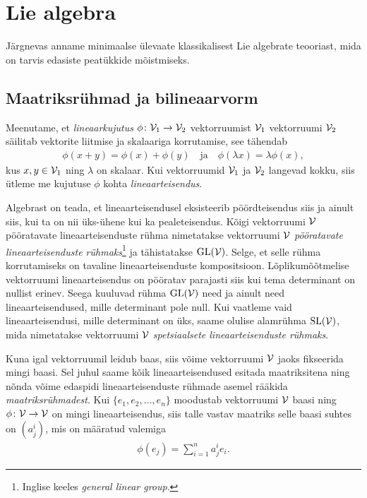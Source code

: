 

\section{Lie algebra}

Järgnevas anname minimaalse ülevaate klassikalisest Lie algebrate
teooriast, mida on tarvis edasiste peatükkide mõistmiseks.

\subsection{Maatriksrühmad ja bilineaarvorm}\label{subsec:mat-ryhmad}

Meenutame, et \emph{lineaarkujutus}
$\phi \colon \mathcal{V}_1 \to \mathcal{V}_2$ vektorruumist $\mathcal{V}_1$ vektorruumi $\mathcal{V}_2$ säilitab
vektorite liitmise ja skalaariga korrutamise, see tähendab
\begin{align*}
    \phi(x + y) = \phi(x) + \phi(y)
    \quad \text{ja} \quad
    \phi(\lambda x) = \lambda \phi(x),
\end{align*}
kus $x, y \in \mathcal{V}_1$ ning $\lambda$ on skalaar. Kui vektorruumid $\mathcal{V}_1$ ja
$\mathcal{V}_2$ langevad kokku, siis ütleme me kujutuse $\phi$ kohta
\emph{lineaarteisendus}.

Algebrast on teada, et lineaarteisendusel eksisteerib pöördteisendus siis ja
ainult siis, kui ta on nii üks-ühene kui ka pealeteisendus. Kõigi vektorruumi
$\mathcal{V}$ pööratavate lineaarteisenduste rühma nimetatakse vektorruumi $\mathcal{V}$
\emph{pööratavate lineaarteisenduste rühmaks}\footnote{Inglise keeles
\emph{general linear group}.} ja tähistatakse $\operatorname{GL}(\mathcal{V})$. Selge, et selle
rühma korrutamiseks on tavaline lineaarteisenduste kompositsioon.
Lõplikumõõtmelise vektorruumi lineaarteisendus on pööratav parajasti siis
kui tema determinant on nullist erinev. Seega kuuluvad rühma $\operatorname{GL}(\mathcal{V})$
need ja ainult need lineaarteisendused, mille determinant pole null.
Kui vaatleme vaid lineaarteisendusi, mille determinant on üks, saame olulise
alamrühma $\operatorname{SL}(\mathcal{V})$, mida nimetatakse vektorruumi $\mathcal{V}$
\emph{spetsiaalsete lineaarteisenduste rühmaks}.

Kuna igal vektorruumil leidub baas, siis võime vektorruumi $\mathcal{V}$ jaoks
fikseerida mingi baasi. Sel juhul
saame kõik lineaarteisendused esitada maatriksitena ning nõnda võime
edaspidi lineaarteisenduste rühmade asemel rääkida \emph{maatriksrühmadest}.
Kui $\{e_1, e_2, \dots, e_n\}$ moodustab vektorruumi $\mathcal{V}$ baasi ning
$\phi \colon \mathcal{V} \to \mathcal{V}$ on mingi lineaarteisendus, siis talle vastav maatriks
selle baasi suhtes on $(a^i_j)$, mis on määratud valemiga
\begin{align*}
    \phi(e_j) = \sum_{i=1}^{n} a^i_j e_i.
\end{align*}

